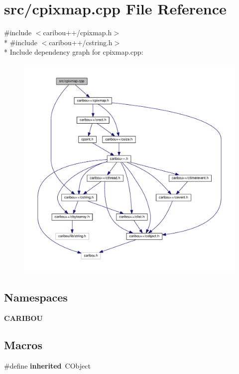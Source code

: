 \section{src/cpixmap.cpp File Reference}
\label{cpixmap_8cpp}
{\ttfamily \#include $<$caribou++/cpixmap.\+h$>$}\\*
{\ttfamily \#include $<$caribou++/cstring.\+h$>$}\\*
Include dependency graph for cpixmap.\+cpp\+:
\nopagebreak
\begin{figure}[H]
\begin{center}
\leavevmode
\includegraphics[width=350pt]{cpixmap_8cpp__incl}
\end{center}
\end{figure}
\subsection*{Namespaces}
\begin{DoxyCompactItemize}
\item 
 {\bf C\+A\+R\+I\+B\+OU}
\end{DoxyCompactItemize}
\subsection*{Macros}
\begin{DoxyCompactItemize}
\item 
\#define {\bf inherited}~C\+Object
\end{DoxyCompactItemize}


